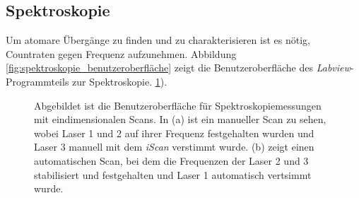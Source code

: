 \subsection{Spektroskopie}\label{subsec:spektroskopie_software}
Um atomare Übergänge zu finden und zu charakterisieren ist es nötig, Countraten
gegen Frequenz aufzunehmen. Abbildung \ref{fig:spektroskopie_benutzeroberfläche}
zeigt die Benutzeroberfläche des \textit{Labview}-Programmteils zur
Spektroskopie.
\ref{fig:spektroskopie_benutzeroberflaeche}).\par
\begin{figure}[h]
 	\centering
	\caption[Benutzeroberfläche
	Spektroskopie]{Abgebildet ist die Benutzeroberfläche für
	Spektroskopiemessungen mit eindimensionalen Scans. In (a) ist ein manueller
	Scan zu sehen, wobei Laser 1 und 2 auf ihrer Frequenz festgehalten wurden und Laser 3 manuell mit dem
	\textit{iScan} verstimmt wurde. (b) zeigt einen automatischen Scan, bei dem die
	Frequenzen der Laser 2 und 3 stabilisiert und festgehalten und Laser 1
	automatisch vertsimmt wurde.}
	\label{fig:spektroskopie_benutzeroberflaeche}
\end{figure}
